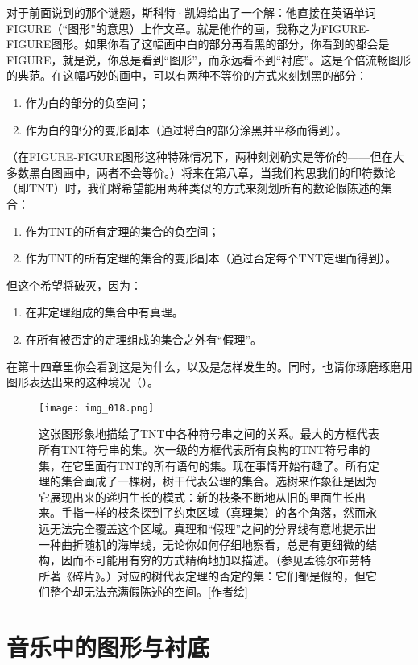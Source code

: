 对于前面说到的那个谜题，斯科特·凯姆给出了一个解：他直接在英语单词FIGURE（“图形”的意思）上作文章。就是他作的画，我称之为FIGURE-FIGURE图形。如果你看了这幅画中白的部分再看黑的部分，你看到的都会是FIGURE，就是说，你总是看到“图形”，而永远看不到“衬底”。这是个倍流畅图形的典范。在这幅巧妙的画中，可以有两种不等价的方式来刻划黑的部分：
\begin{enumerate}
\item 作为白的部分的负空间；
\item 作为白的部分的变形副本（通过将白的部分涂黑并平移而得到）。
\end{enumerate}
（在FIGURE-FIGURE图形这种特殊情况下，两种刻划确实是等价的——但在大多数黑白图画中，两者不会等价。）将来在第八章，当我们构思我们的印符数论（即TNT）时，我们将希望能用两种类似的方式来刻划所有的数论假陈述的集合：
\begin{enumerate}
\item 作为TNT的所有定理的集合的负空间；
\item 作为TNT的所有定理的集合的变形副本（通过否定每个TNT定理而得到）。
\end{enumerate}
但这个希望将破灭，因为：
\begin{enumerate}
\item 在非定理组成的集合中有真理。
\item 在所有被否定的定理组成的集合之外有“假理”。
\end{enumerate}
在第十四章里你会看到这是为什么，以及是怎样发生的。同时，也请你琢磨琢磨用图形表达出来的这种境况（）。

\begin{figure}
\texttt{[image: img\_018.png]}
\caption[各类串之间的关系图示。]
  {这张图形象地描绘了TNT中各种符号串之间的关系。最大的方框代表所有TNT符号串的集。次一级的方框代表所有良构的TNT符号串的集，在它里面有TNT的所有语句的集。现在事情开始有趣了。所有定理的集合画成了一棵树，树干代表公理的集合。选树来作象征是因为它展现出来的递归生长的模式：新的枝条不断地从旧的里面生长出来。手指一样的枝条探到了约束区域（真理集）的各个角落，然而永远无法完全覆盖这个区域。真理和“假理”之间的分界线有意地提示出一种曲折随机的海岸线，无论你如何仔细地察看，总是有更细微的结构，因而不可能用有穷的方式精确地加以描述。（参见孟德尔布劳特所著《碎片》。）对应的树代表定理的否定的集：它们都是假的，但它们整个却无法充满假陈述的空间。[作者绘]}
\end{figure}

\section{音乐中的图形与衬底}

